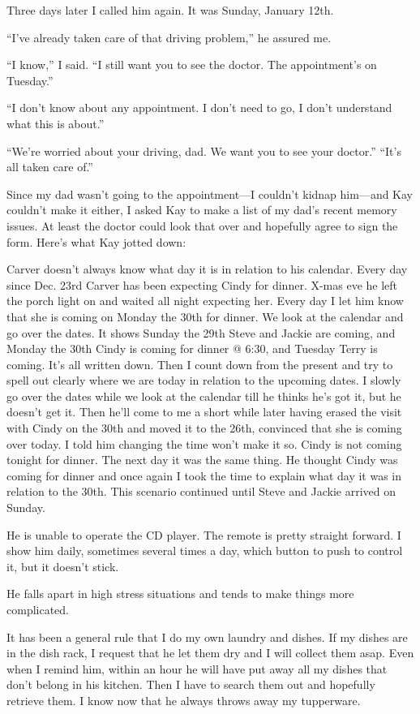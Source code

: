 \documentclass[12pt]{book}
\begin{document}
Three days later I called him again. It was Sunday, January 12th.

``I've already taken care of that driving problem,'' he assured me.

``I know,'' I said. ``I still want you to see the doctor. The appointment's on Tuesday.''

``I don't know about any appointment. I don't need to go, I don't understand what this is about.''

``We're worried about your driving, dad. We want you to see your doctor.'' ``It's all taken care of.''

Since my dad wasn't going to the appointment---I couldn't kidnap him---and Kay couldn't make it either, I asked Kay to make a list of my dad's recent memory issues. At least the doctor could look that over and hopefully agree to sign the form. Here's what Kay jotted down:

Carver doesn't always know what day it is in relation to his calendar. Every day since Dec. 23rd Carver has been expecting Cindy for dinner. X-mas eve he left the porch light on and waited all night expecting her. Every day I let him know that she is coming on Monday the 30th for dinner. We look at the calendar and go over the dates. It shows Sunday the 29th Steve and Jackie are coming, and Monday the 30th Cindy is coming for dinner @ 6:30, and Tuesday Terry is coming. It's all written down. Then I count down from the present and try to spell out clearly where we are today in relation to the upcoming dates. I slowly go over the dates while we look at the calendar till he thinks he's got it, but he doesn't get it. Then he'll come to me a short while later having erased the visit with Cindy on the 30th and moved it to the 26th, convinced that she is coming over today. I told him changing the time won't make it so. Cindy is not coming tonight for dinner. The next day it was the same thing. He thought Cindy was coming for dinner and once again I took the time to explain what day it was in relation to the 30th. This scenario continued until Steve and Jackie arrived on Sunday.

He is unable to operate the CD player. The remote is pretty straight forward. I show him daily, sometimes several times a day, which button to push to control it, but it doesn't stick.

He falls apart in high stress situations and tends to make things more complicated.

It has been a general rule that I do my own laundry and dishes. If my dishes are in the dish rack, I request that he let them dry and I will collect them asap. Even when I remind him, within an hour he will have put away all my dishes that don't belong in his kitchen. Then I have to search them out and hopefully retrieve them. I know now that he always throws away my tupperware.
\end{document}
